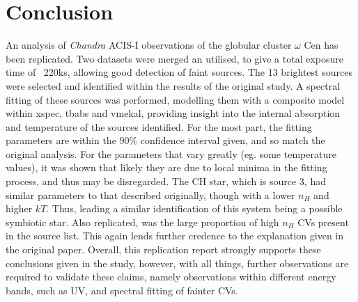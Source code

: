 \documentclass[aps,
                pra,  
                a4paper, 
                amsmath, 
                amssymb, 
                preprint,
                tightenlines,  
                amsfonts,
                nofootinbib,
                notitlepage
            ]{revtex4-2}
\begin{document}
\section{Conclusion}
An analysis of {\it Chandra} ACIS-I observations of the globular cluster $\omega$ Cen has been replicated. Two datasets were merged an utilised, to give a total exposure time of ~220ks, allowing good detection of faint sources. The 13 brightest sources were selected and identified within the results of the original study. A spectral fitting of these sources was performed, modelling them with a composite model within {\sc xspec}, {\sc tbabs} and {\sc vmekal}, providing insight into the internal absorption and temperature of the sources identified. For the most part, the fitting parameters are within the 90\% confidence interval given, and so match the original analysis. For the parameters that vary greatly (eg. some temperature values), it was shown that likely they are due to local minima in the fitting process, and thus may be disregarded. The CH star, which is source 3, had similar parameters to that described originally, though with a lower $n_H$ and higher $kT$. Thus, leading a similar identification of this system being a possible symbiotic star. Also replicated, was the large proportion of high $n_H$ CVs present in the source list. This again lends further credence to the explanation given in the original paper. Overall, this replication report strongly supports these conclusions given in the study, however, with all things, further observations are required to validate these claims, namely observations within different energy bands, such as UV, and spectral fitting of fainter CVs. 

\nocite{*}


\newpage

\appendix
\end{document}
